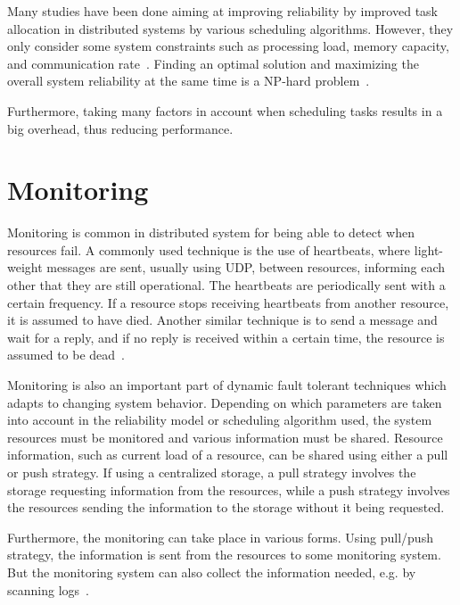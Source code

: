 \documentclass{cslthse-msc}
\begin{document}
Many studies have been done aiming at improving reliability by improved task allocation in distributed systems by various scheduling algorithms. However, they only consider some system constraints such as processing load, memory capacity, and communication rate~\cite{optTaskAllocationForMaxRel}. Finding an optimal solution and maximizing the overall system reliability at the same time is a NP-hard problem~\cite{optTaskAllocationForMaxRel, taskAllocationSwarm, schedulingSurvey}.

Furthermore, taking many factors in account when scheduling tasks results in a big overhead, thus reducing performance. 

\section{Monitoring} \label{sec:background_monitoring}
Monitoring is common in distributed system for being able to detect when resources fail. A commonly used technique is the use of heartbeats, where light-weight messages are sent, usually using UDP, between resources, informing each other that they are still operational. The heartbeats are periodically sent with a certain frequency. If a resource stops receiving heartbeats from another resource, it is assumed to have died. Another similar technique is to send a message and wait for a reply, and if no reply is received within a certain time, the resource is assumed to be dead~\cite{probabilistic_recovery}.

Monitoring is also an important part of dynamic fault tolerant techniques which adapts to changing system behavior. Depending on which parameters are taken into account in the reliability model or scheduling algorithm used, the system resources must be monitored and various information must be shared. Resource information, such as current load of a resource, can be shared using either a pull or push strategy. If using a centralized storage, a pull strategy involves the storage requesting information from the resources, while a push strategy involves the resources sending the information to the storage without it being requested.

Furthermore, the monitoring can take place in various forms. Using pull/push strategy, the information is sent from the resources to some monitoring system. But the monitoring system can also collect the information needed, e.g. by scanning logs~\cite{probabilistic_recovery}.
\end{document}

